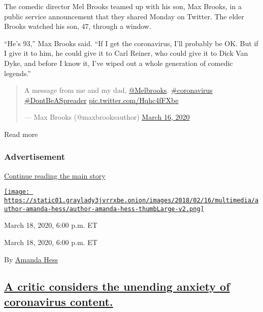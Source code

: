 \begin{quote}
\end{quote}

The comedic director Mel Brooks teamed up with his son, Max Brooks, in a
public service announcement that they shared Monday on Twitter. The
elder Brooks watched his son, 47, through a window.

``He's 93,'' Max Brooks said. ``If I get the coronavirus, I'll probably
be OK. But if I give it to him, he could give it to Carl Reiner, who
could give it to Dick Van Dyke, and before I know it, I've wiped out a
whole generation of comedic legends.''

\begin{quote}
A message from me and my dad,
\href{https://twitter.com/MelBrooks?ref_src=twsrc\%5Etfw}{@Melbrooks}.
\href{https://twitter.com/hashtag/coronavirus?src=hash\&ref_src=twsrc\%5Etfw}{\#coronavirus}
\href{https://twitter.com/hashtag/DontBeASpreader?src=hash\&ref_src=twsrc\%5Etfw}{\#DontBeASpreader}
\href{https://t.co/Hqhc4fFXbe}{pic.twitter.com/Hqhc4fFXbe}

--- Max Brooks (@maxbrooksauthor)
\href{https://twitter.com/maxbrooksauthor/status/1239624352305303552?ref_src=twsrc\%5Etfw}{March
16, 2020}
\end{quote}

Read more

\hypertarget{advertisement-2}{%
\subsubsection{Advertisement}\label{advertisement-2}}

\protect\hyperlink{after-dfp-ad-mid3}{Continue reading the main story}

\href{https://www.nytimes3xbfgragh.onion/by/amanda-hess}{\texttt{[image: https://static01.graylady3jvrrxbe.onion/images/2018/02/16/multimedia/author-amanda-hess/author-amanda-hess-thumbLarge-v2.png]}}

March 18, 2020, 6:00 p.m. ET

March 18, 2020, 6:00 p.m. ET

By \href{https://www.nytimes3xbfgragh.onion/by/amanda-hess}{Amanda Hess}

\hypertarget{a-critic-considers-the-unending-anxiety-of-coronavirus-content}{%
\subsection{\texorpdfstring{\protect\hyperlink{a-critic-considers-the-unending-anxiety-of-coronavirus-content}{A
critic considers the unending anxiety of coronavirus
content.}}{A critic considers the unending anxiety of coronavirus content.}}\label{a-critic-considers-the-unending-anxiety-of-coronavirus-content}}

